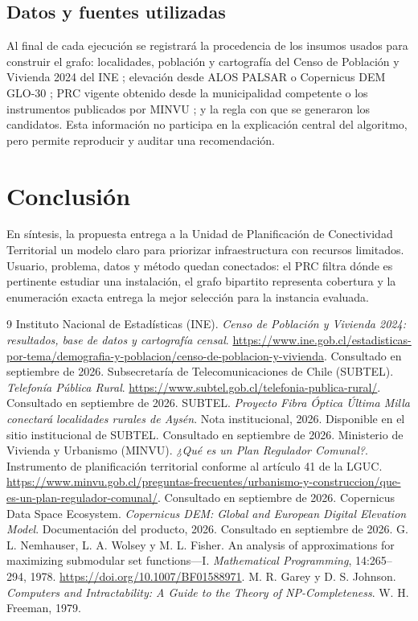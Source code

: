 \documentclass[12pt,letterpaper]{article}
\newcommand{\userrole}{Unidad de Planificación de Conectividad Territorial}
\begin{document}
\subsection{Datos y fuentes utilizadas}
Al final de cada ejecución se registrará la procedencia de los insumos usados para construir el grafo: localidades, población y cartografía del Censo de Población y Vivienda 2024 del INE \cite{inecenso2024}; elevación desde ALOS PALSAR o Copernicus DEM GLO-30 \cite{copernicus}; PRC vigente obtenido desde la municipalidad competente o los instrumentos publicados por MINVU \cite{minvuprc}; y la regla con que se generaron los candidatos. Esta información no participa en la explicación central del algoritmo, pero permite reproducir y auditar una recomendación.

\section{Conclusión}
En síntesis, la propuesta entrega a la \userrole{} un modelo claro para priorizar infraestructura con recursos limitados. Usuario, problema, datos y método quedan conectados: el PRC filtra dónde es pertinente estudiar una instalación, el grafo bipartito representa cobertura y la enumeración exacta entrega la mejor selección para la instancia evaluada.

\begin{thebibliography}{9}
 Instituto Nacional de Estadísticas (INE). \emph{Censo de Población y Vivienda 2024: resultados, base de datos y cartografía censal}. \url{https://www.ine.gob.cl/estadisticas-por-tema/demografia-y-poblacion/censo-de-poblacion-y-vivienda}. Consultado en septiembre de 2026.
 Subsecretaría de Telecomunicaciones de Chile (SUBTEL). \emph{Telefonía Pública Rural}. \url{https://www.subtel.gob.cl/telefonia-publica-rural/}. Consultado en septiembre de 2026.
 SUBTEL. \emph{Proyecto Fibra Óptica Última Milla conectará localidades rurales de Aysén}. Nota institucional, 2026. Disponible en el sitio institucional de SUBTEL. Consultado en septiembre de 2026.
 Ministerio de Vivienda y Urbanismo (MINVU). \emph{¿Qué es un Plan Regulador Comunal?}. Instrumento de planificación territorial conforme al artículo 41 de la LGUC. \url{https://www.minvu.gob.cl/preguntas-frecuentes/urbanismo-y-construccion/que-es-un-plan-regulador-comunal/}. Consultado en septiembre de 2026.
 Copernicus Data Space Ecosystem. \emph{Copernicus DEM: Global and European Digital Elevation Model}. Documentación del producto, 2026. Consultado en septiembre de 2026.
 G. L. Nemhauser, L. A. Wolsey y M. L. Fisher. An analysis of approximations for maximizing submodular set functions---I. \emph{Mathematical Programming}, 14:265--294, 1978. \url{https://doi.org/10.1007/BF01588971}.
 M. R. Garey y D. S. Johnson. \emph{Computers and Intractability: A Guide to the Theory of NP-Completeness}. W. H. Freeman, 1979.
\end{thebibliography}
\end{document}
